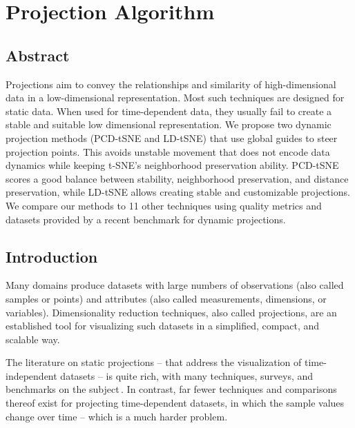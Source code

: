\chapter{Projection Algorithm}

\section{Abstract}
Projections aim to convey the relationships and similarity of high-dimensional data in a low-dimensional representation.
Most such techniques are designed for static data. When used for time-dependent data, they usually fail to create a stable and suitable low dimensional representation.
We propose two dynamic projection methods (PCD-tSNE and LD-tSNE) that use global guides to steer projection points. This avoids unstable movement that does not encode data dynamics while keeping t-SNE's neighborhood preservation ability. PCD-tSNE scores a good balance between stability, neighborhood preservation, and distance preservation, while LD-tSNE allows creating stable and customizable projections. We compare our methods to 11 other techniques using quality metrics and datasets provided by a recent benchmark for dynamic projections.
    
\section{Introduction}
%

Many domains produce datasets with large numbers of observations (also called samples or points) and attributes (also called measurements, dimensions, or variables). Dimensionality reduction techniques, also called projections, are an established tool for visualizing such datasets in a simplified, compact, and scalable way.

The literature on static projections -- that address the visualization of time-independent datasets -- is quite rich, with many techniques, surveys, and benchmarks on the subject\,\cite{Nonato2019,Espadoto2019,sorzano14_survey,cunningham15_survey}. In contrast, far fewer techniques and comparisons thereof exist for projecting time-dependent datasets, in which the sample values change over time -- which is a much harder problem.

